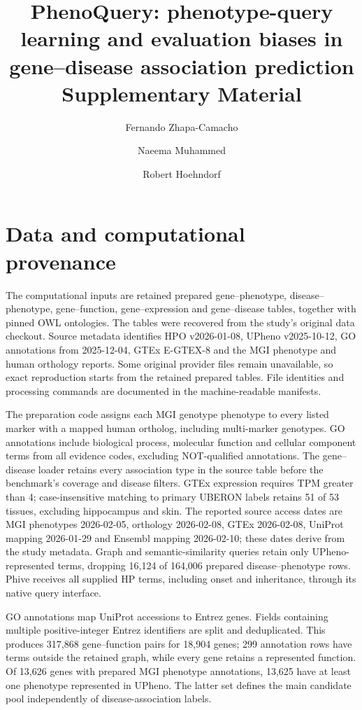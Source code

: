 \documentclass{article}
\title{PhenoQuery: phenotype-query learning and evaluation biases in gene--disease association prediction\\ Supplementary Material}
\author{Fernando Zhapa-Camacho \and Naeema Muhammed \and Robert Hoehndorf}
\date{}
\begin{document}
\maketitle

\section{Data and computational provenance}

The computational inputs are retained prepared gene--phenotype, disease--phenotype,
gene--function, gene--expression and gene--disease tables, together with pinned
OWL ontologies. The tables were recovered from the study's original data
checkout. Source metadata identifies HPO v2026-01-08, UPheno v2025-10-12,
GO annotations from 2025-12-04, GTEx E-GTEX-8 and the MGI phenotype and human
orthology reports. Some original provider files remain unavailable, so exact
reproduction starts from the retained prepared tables. File identities and
processing commands are documented in the machine-readable manifests.

The preparation code assigns each MGI genotype phenotype to every listed
marker with a mapped human ortholog, including multi-marker genotypes. GO
annotations include biological process, molecular function and cellular
component terms from all evidence codes, excluding NOT-qualified annotations.
The gene--disease loader retains every association type in the source table
before the benchmark's coverage and disease filters. GTEx expression requires
TPM greater than 4; case-insensitive matching to primary UBERON labels retains
51 of 53 tissues, excluding hippocampus and skin. The reported source access
dates are MGI phenotypes 2026-02-05, orthology 2026-02-08, GTEx 2026-02-08,
UniProt mapping 2026-01-29 and Ensembl mapping 2026-02-10; these dates derive
from the study metadata. Graph and semantic-similarity queries retain only
UPheno-represented terms, dropping 16,124 of 164,006 prepared disease--phenotype
rows. Phive receives all supplied HP terms, including onset and inheritance,
through its native query interface.

GO annotations map UniProt accessions to Entrez genes. Fields containing
multiple positive-integer Entrez identifiers are split and deduplicated. This
produces 317,868 gene--function pairs for 18,904 genes; 299 annotation rows
have terms outside the retained graph, while every gene retains a represented
function. Of 13,626 genes with prepared MGI phenotype annotations, 13,625 have
at least one phenotype represented in UPheno. The latter set defines the main
candidate pool independently of disease-association labels.
\end{document}
